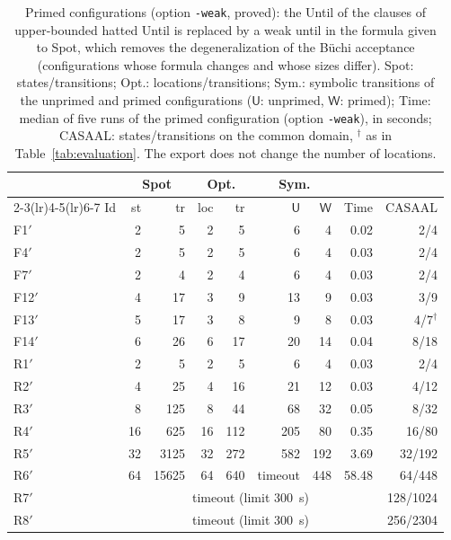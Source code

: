 \begin{table}[t]
\centering
\caption{Primed configurations (option \texttt{-weak}, proved): the Until of the clauses of upper-bounded hatted Until is replaced by a weak until in the formula given to Spot, which removes the degeneralization of the B\"uchi acceptance (configurations whose formula changes and whose sizes differ).  Spot: states/transitions; Opt.: locations/transitions; Sym.: symbolic transitions of the unprimed and primed configurations ($\mathsf{U}$: unprimed, $\mathsf{W}$: primed); Time: median of five runs of the primed configuration (option \texttt{-weak}), in seconds; CASAAL: states/transitions on the common domain, $^\dagger$ as in Table~\ref{tab:evaluation}.  The export does not change the number of locations.}
\label{tab:weak}
\footnotesize
\setlength{\tabcolsep}{3pt}
\begin{tabular}{@{}lrrrrrrrr@{}}
\toprule
 & \multicolumn{2}{c}{Spot} & \multicolumn{2}{c}{Opt.} & \multicolumn{2}{c}{Sym.} & & \\
\cmidrule(lr){2-3}\cmidrule(lr){4-5}\cmidrule(lr){6-7}
Id & st & tr & loc & tr & $\mathsf{U}$ & $\mathsf{W}$ & Time & CASAAL\\
\midrule
F1$'$ & 2 & 5 & 2 & 5 & 6 & 4 & 0.02 & 2/4\\
F4$'$ & 2 & 5 & 2 & 5 & 6 & 4 & 0.03 & 2/4\\
F7$'$ & 2 & 4 & 2 & 4 & 6 & 4 & 0.03 & 2/4\\
F12$'$ & 4 & 17 & 3 & 9 & 13 & 9 & 0.03 & 3/9\\
F13$'$ & 5 & 17 & 3 & 8 & 9 & 8 & 0.03 & 4/7$^\dagger$\\
F14$'$ & 6 & 26 & 6 & 17 & 20 & 14 & 0.04 & 8/18\\
R1$'$ & 2 & 5 & 2 & 5 & 6 & 4 & 0.03 & 2/4\\
R2$'$ & 4 & 25 & 4 & 16 & 21 & 12 & 0.03 & 4/12\\
R3$'$ & 8 & 125 & 8 & 44 & 68 & 32 & 0.05 & 8/32\\
R4$'$ & 16 & 625 & 16 & 112 & 205 & 80 & 0.35 & 16/80\\
R5$'$ & 32 & 3125 & 32 & 272 & 582 & 192 & 3.69 & 32/192\\
R6$'$ & 64 & 15625 & 64 & 640 & timeout & 448 & 58.48 & 64/448\\
R7$'$ & \multicolumn{7}{c}{timeout (limit 300~s)} & 128/1024\\
R8$'$ & \multicolumn{7}{c}{timeout (limit 300~s)} & 256/2304\\
\bottomrule
\end{tabular}
\end{table}

